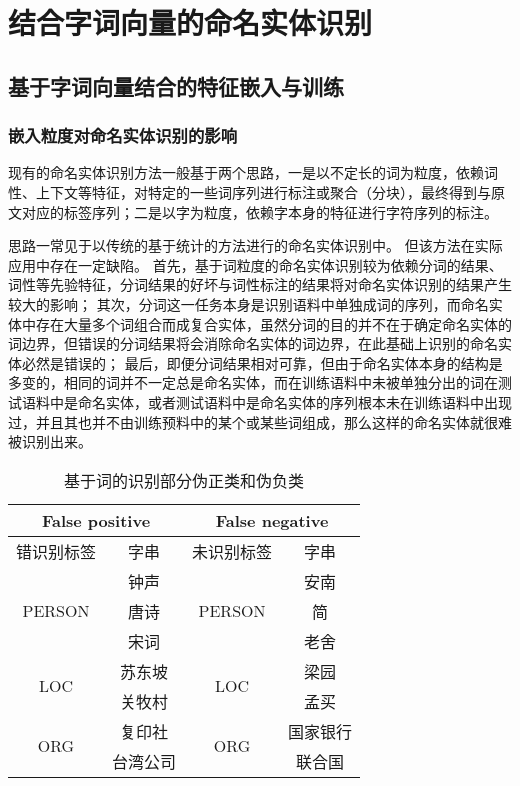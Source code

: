 \chapter{结合字词向量的命名实体识别}
\section{基于字词向量结合的特征嵌入与训练}
\subsection{嵌入粒度对命名实体识别的影响}
现有的命名实体识别方法一般基于两个思路，一是以不定长的词为粒度，依赖词性、上下文等特征，对特定的一些词序列进行标注或聚合（分块），最终得到与原文对应的标签序列；二是以字为粒度，依赖字本身的特征进行字符序列的标注。

思路一常见于以传统的基于统计的方法进行的命名实体识别中。
但该方法在实际应用中存在一定缺陷。
首先，基于词粒度的命名实体识别较为依赖分词的结果、词性等先验特征，分词结果的好坏与词性标注的结果将对命名实体识别的结果产生较大的影响；
其次，分词这一任务本身是识别语料中单独成词的序列，而命名实体中存在大量多个词组合而成复合实体，虽然分词的目的并不在于确定命名实体的词边界，但错误的分词结果将会消除命名实体的词边界，在此基础上识别的命名实体必然是错误的；
最后，即便分词结果相对可靠，但由于命名实体本身的结构是多变的，相同的词并不一定总是命名实体，而在训练语料中未被单独分出的词在测试语料中是命名实体，或者测试语料中是命名实体的序列根本未在训练语料中出现过，并且其也并不由训练预料中的某个或某些词组成，那么这样的命名实体就很难被识别出来。

\begin{table}[H]
    \centering
    \caption{基于词的识别部分伪正类和伪负类}
    \begin{tabular}{cccc}
        \toprule
        \multicolumn{2}{c}{False positive} & \multicolumn{2}{c}{False negative}\\
        \midrule
        错识别标签 & 字串 & 未识别标签 & 字串\\
        \cmidrule(lr){1-2}\cmidrule(lr){3-4}
        \multirow{3}{*}{PERSON} & 钟声 & \multirow{3}{*}{PERSON} & 安南 \\
        & 唐诗 & & 简 \\
        & 宋词 & & 老舍\\
        \cmidrule(lr){1-2}\cmidrule(lr){3-4}
        \multirow{2}{*}{LOC} & 苏东坡 & \multirow{2}{*}{LOC}& 梁园\\
        & 关牧村 & & 孟买 \\
        \cmidrule(lr){1-2}\cmidrule(lr){3-4}
        \multirow{2}{*}{ORG} & 复印社 & \multirow{2}{*}{ORG}& 国家银行\\
        & 台湾公司 & & 联合国\\
        \bottomrule
    \end{tabular}
    \label{tab:fp_fn_word}
\end{table}

